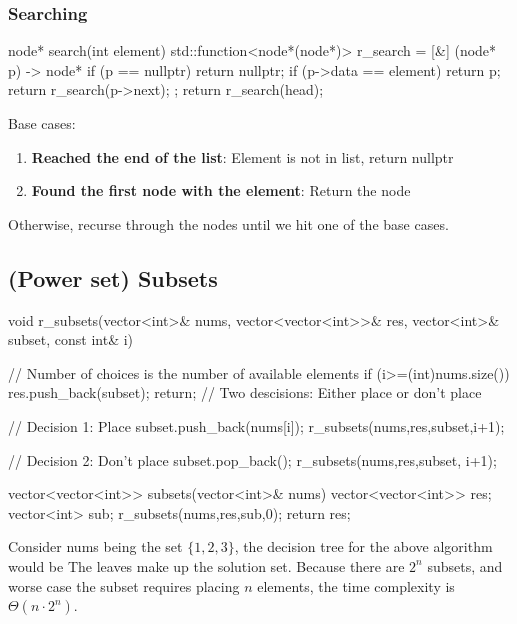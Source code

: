 \documentclass{report}
\begin{document}
\pagebreak 
\subsubsection{Searching}
\bigbreak \noindent 
\begin{cppcode}
    node* search(int element) {
        std::function<node*(node*)> r_search = [&] (node* p) -> node* {
            if (p == nullptr)  {
                return nullptr;
            }
            if (p->data == element) {
                return p;
            }
            return r_search(p->next);
        };
        return r_search(head);
    }
\end{cppcode}
\bigbreak \noindent 
Base cases:
\begin{enumerate}
    \item \textbf{Reached the end of the list}: Element is not in list, return nullptr
    \item \textbf{Found the first node with the element}: Return the node
\end{enumerate}
\bigbreak \noindent 
Otherwise, recurse through the nodes until we hit one of the base cases.

\pagebreak 
{}
\bigbreak \noindent 
\subsection{(Power set) Subsets}
\bigbreak \noindent 
\begin{cppcode}
    void r_subsets(vector<int>& nums, vector<vector<int>>& res, vector<int>& subset, const int& i) {
        // Number of choices is the number of available elements
        if (i>=(int)nums.size()) {
            res.push_back(subset);
            return;
        }
        // Two descisions: Either place or don't place

        // Decision 1: Place
        subset.push_back(nums[i]);
        r_subsets(nums,res,subset,i+1);

        // Decision 2: Don't place
        subset.pop_back();
        r_subsets(nums,res,subset, i+1);
    }       
    vector<vector<int>> subsets(vector<int>& nums) {
        vector<vector<int>> res;
        vector<int> sub;
        r_subsets(nums,res,sub,0);
        return res;
    }
\end{cppcode}
\bigbreak \noindent 
Consider nums being the set $\{1,2,3\}$, the decision tree for the above algorithm would be
\bigbreak \noindent 
{}
\bigbreak \noindent 
The leaves make up the solution set. Because there are $2^{n}$ subsets, and worse case the subset requires placing $n$ elements, the time complexity is $\Theta(n \cdot 2^{n})$.
\bigbreak \noindent 
\pagebreak 
\end{document}
